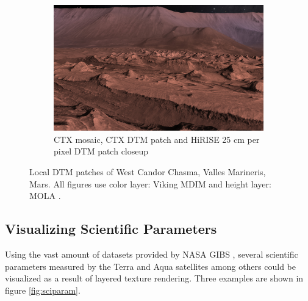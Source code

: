 \begin{figure}[h]
    \par\bigskip
    \begin{subfigure}[t]{0.90\textwidth}
        \includegraphics[width=\textwidth]{figures/results/screenshots_thesis_old/west_candor_chasma3.jpg}
        \caption{CTX mosaic, CTX DTM patch and HiRISE 25 cm per pixel DTM patch closeup}
    \end{subfigure}
    \caption{Local DTM patches of West Candor Chasma, Valles Marineris, Mars. All figures use color layer: Viking MDIM \cite{viking} and height layer: MOLA \cite{mola}.}
    \label{fig:localpatches}
\end{figure}


\clearpage
\subsection{Visualizing Scientific Parameters}
\FloatBarrier

Using the vast amount of datasets provided by NASA GIBS \cite{gibs}, several scientific parameters measured by the Terra and Aqua satellites among others could be visualized as a result of layered texture rendering. Three examples are shown in figure \ref{fig:sciparam}.

